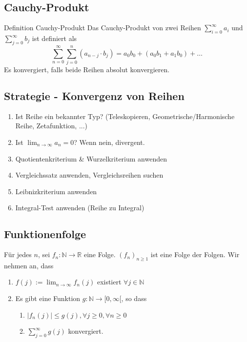 \documentclass[a4paper,fontsize = 7pt]{scrartcl}
\def\limn{\lim_{n\to \infty}}
\def\R{\mathbb{R}}
\def\N{\mathbb{N}}
\begin{document}
\subsection{Cauchy-Produkt}
\begin{subbox}{Definition Cauchy-Produkt}
  \vspace{-4pt}
  Das Cauchy-Produkt von zwei Reihen $\sum_{i = 0}^\infty a_i$ und $\sum_{j = 0}^\infty b_j$ ist definiert als
  $$\sum_{n=0}^\infty \sum_{j=0}^n (a_{n-j} \cdot b_j) = a_0b_0 + (a_0b_1 + a_1b_0) + \ldots$$ Es konvergiert, falls beide Reihen absolut konvergieren.
  \vspace{-4pt}
\end{subbox}

\subsection{Strategie - Konvergenz von Reihen}
\begin{enumerate}
 \item Ist Reihe ein bekannter Typ? (Teleskopieren, Geometrische/Harmonische Reihe, Zetafunktion, ...)
 \item Ist $\limn a_n = 0$? Wenn nein, divergent.
 \item Quotientenkriterium \& Wurzelkriterium anwenden
 \item Vergleichssatz anwenden, Vergleichsreihen suchen
 \item Leibnizkriterium anwenden
 \item Integral-Test anwenden (Reihe zu Integral)
\end{enumerate}

\subsection{Funktionenfolge}
Für jedes $n$, sei $f_n: \N \to \R$ eine Folge. $(f_n)_{n \geq 1}$ ist eine Folge der Folgen. 
Wir nehmen an, dass
\begin{enumerate}
  \item $f(j) := \limn f_n(j)$ existiert $\forall j \in \N$
  \item Es gibt eine Funktion $g: \N \to [0, \infty[$, so dass
  \begin{enumerate}
    \item $|f_n(j)| \leq g(j), \forall j \geq 0,\forall n \geq 0$
    \item $\sum_{j = 0}^{\infty} g(j)$ konvergiert.
  \end{enumerate}
\end{enumerate}
\end{document}
